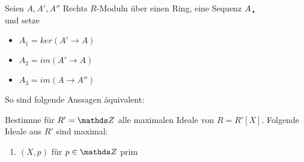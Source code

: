 \documentclass[ngerman, parskip=half, titlepage=false]{scrartcl}
\begin{document}
\begin{Lem}
  Seien $A,A',A''$ Rechts $R$-Moduln über einen Ring, eine Sequenz
   $A_{\text{\Huge.}}$\\
   und setze 
   \begin{itemize}
   \item $A_1 = ker(A' \rightarrow A) $
   \item $A_2 = im(A' \rightarrow A)$
   \item $A_3 = im(A \rightarrow A'')$
   \end{itemize}
   So sind folgende Aussagen äquivalent:\\
 \end{Lem}

\begin{Auf}
  Bestimme für $R'=\Z$ alle maximalen Ideale von $R=R'[X]$.
  Folgende Ideale aus $R'$ sind maximal:
  \begin{enumerate}
    \item $(X,p)$ für $p \in \Z$ prim 
  \end{enumerate}
\end{Auf}
\end{document}
